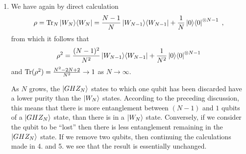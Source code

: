 \documentclass[12pt]{article}
\begin{document}
\begin{enumerate}
\begin{enumerate}
	\item We have again by direct calculation
	$$\rho = \mathrm{Tr}_N \ket{W_N}\!\bra{W_N} = \frac{N-1}{N}\ket{W_{N-1}}\!\bra{W_{N-1}}+\frac{1}{N}\ket{0}\!\bra{0}^{\otimes {N-1}}\;,$$ from which it follows that $$\rho ^2 = \frac{(N-1)^2}{N^2}\ket{W_{N-1}}\!\bra{W_{N-1}}+\frac{1}{N^2}\ket{0}\!\bra{0}^{\otimes {N-1}}$$ and $\mathrm{Tr}( \rho ^2) = \frac{N^2-2N+2}{N^2} \rightarrow 1$ as $N \rightarrow \infty$.
	
	As $N$ grows, the $\ket{GHZ_N}$ states to which one qubit has been discarded have a lower purity than the $\ket{W_N}$ states. According to the preceding discussion, this means that there is more entanglement between $(N-1)$ and $1$ qubits of a $\ket{GHZ_N}$ state, than there is in a $\ket{W_N}$ state. Conversely, if we consider the qubit to be ``lost'' then there is less entanglement remaining in the $\ket{GHZ_N}$ state. If we remove two qubits, then continuing the calculations made in 4. and 5. we see that the result is essentially unchanged.
\end{enumerate}



\end{enumerate}
\end{document}

